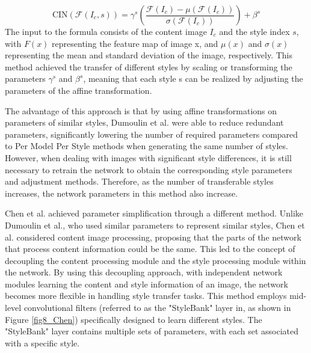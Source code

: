 \begin{equation}
    \label{IN}
    \text{CIN}\left(\mathcal{F}(I_c,s)\right) = \gamma^s\left(\frac{\mathcal{F}(I_c)-\mu(\mathcal{F}(I_c))}{\sigma(\mathcal{F}(I_c))}\right)+\beta^s
\end{equation}
The input to the formula consists of the content image $I_c$ and the style index $s$, with $F(x)$ representing the feature map of image x, and $\mu(x)$ and $\sigma(x)$ representing the mean and standard deviation of the image, respectively. This method achieved the transfer of different styles by scaling or transforming the parameters $\gamma^s$ and $\beta^s$, meaning that each style s can be realized by adjusting the parameters of the affine transformation.

The advantage of this approach is that by using affine transformations on parameters of similar styles, Dumoulin et al. were able to reduce redundant parameters, significantly lowering the number of required parameters compared to Per Model Per Style methods when generating the same number of styles. However, when dealing with images with significant style differences, it is still necessary to retrain the network to obtain the corresponding style parameters and adjustment methods. Therefore, as the number of transferable styles increases, the network parameters in this method also increase.

Chen et al.\citep{40chen2017stylebank} achieved parameter simplification through a different method. Unlike Dumoulin et al.\citep{39dumoulin2016learned}, who used similar parameters to represent similar styles, Chen et al. \citep{40chen2017stylebank} considered content image processing, proposing that the parts of the network that process content information could be the same. This led to the concept of decoupling the content processing module and the style processing module within the network. By using this decoupling approach, with independent network modules learning the content and style information of an image, the network becomes more flexible in handling style transfer tasks. This method employs mid-level convolutional filters (referred to as the "StyleBank" layer in\citep{40chen2017stylebank}, as shown in Figure \ref{fig8_Chen}) specifically designed to learn different styles. The "StyleBank" layer contains multiple sets of parameters, with each set associated with a specific style.

